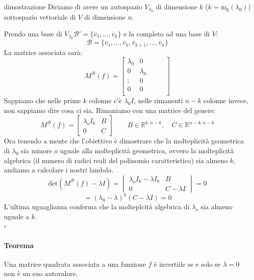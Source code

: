 \documentclass[x11names]{article}
\newcommand*{\QEDB}{\null\nobreak\hfill\ensuremath{\square}}%
\begin{document}
\begin{es}{dimostrazione}
Diciamo di avere un autospazio $V_{\lambda_{0}}$ di dimensione $k$ ($k = \text{m}_{\text{g}}\left(\lambda_{0}\right)$) sottospazio vettoriale di $V$ di dimensione $n$.

\noindent
Prendo una base di $V_{\lambda_{0}} $$\mathscr{B}' = \{\overline{v}_{1},\dots,\overline{v}_{k}\}$ e la completo ad una base di $V$: 
\[
\mathscr{B} = \{\overline{v}_{1},\dots,\overline{v}_{k},\overline{v}_{k+1},\dots,\overline{v}_{n}\}
\] 
La matrice associata sarà:
\[
M^{\mathscr{B}}\left(f\right) = \begin{bmatrix}
     \lambda_{0}& 0 &  &  &\\
     0&\lambda_{0}  &  &  &\\
     \vdots& 0 &  &  &\\
     0& 0 &  &  &\\
\end{bmatrix}
\] 
Sappiamo che nelle prime $k$ colonne c'è $\lambda_{0}I$, nelle rimanenti $n-k$ colonne invece, non sappiamo dire cosa ci sia. Rimaniamo con una matrice del genere:
 \[
M^{\mathscr{B}}\left(f\right) = \begin{bmatrix}
    \lambda_{o}I_{k} & B \\
     0& C 
\end{bmatrix}
\qquad B \in \mathbb{R}^{k,n-k}, \quad C \in \mathbb{R}^{n-k,n-k}
\] 
Ora tenendo a mente che l'obiettivo è dimostrare che la molteplicità geometrica di $\lambda_{0}$ sia minore o uguale alla molteplicità geometrica, ovvero la molteplicità algebrica (il numero di radici reali del polinomio caratteristico) sia almeno $k$, andiamo a calcolare i nostri lambda.
\[
	 \text{det}\left(M^{\mathscr{B}}\left(f\right) - \lambda I\right) = 
	 \begin{vmatrix}
	\lambda_{o}I_{k} - \lambda I_{k} & B \\
     	0& C - \lambda I 
	\end{vmatrix} = 0
\] 
\[
= \left(\lambda_{0} - \lambda\right)^{k}\left(C-\lambda I\right) = 0
\] 
L'ultima uguaglianza conferma che la molteplcità algebrica di $\lambda_{o}$ sia almeno uguale a $k$.
\\
\QEDB
\end{es}



\paragraph{Teorema}
Una matrice quadrata associata a una funzione $f$ è invertiile se e solo se $\lambda = 0$ non è un suo autovalore. 
\end{document}

